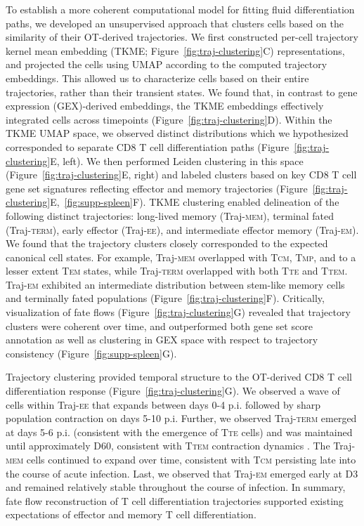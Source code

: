 To establish a more coherent computational model for fitting fluid differentiation paths, we developed an unsupervised approach that clusters cells based on the similarity of their OT-derived trajectories. We first constructed per-cell trajectory kernel mean embedding (TKME; Figure~\ref{fig:traj-clustering}C) representations, and projected the cells using UMAP according to the computed trajectory embeddings. This allowed us to characterize cells based on their entire trajectories, rather than their transient states. We found that, in contrast to gene expression (GEX)-derived embeddings, the TKME embeddings effectively integrated cells across timepoints (Figure~\ref{fig:traj-clustering}D). Within the TKME UMAP space, we observed distinct distributions which we hypothesized corresponded to separate CD8 T cell differentiation paths (Figure~\ref{fig:traj-clustering}E, left). We then performed Leiden clustering in this space (Figure~\ref{fig:traj-clustering}E, right) and labeled clusters based on key CD8 T cell gene set signatures reflecting effector and memory trajectories (Figure~\ref{fig:traj-clustering}E,~\ref{fig:supp-spleen}F). TKME clustering enabled delineation of the following distinct trajectories: long-lived memory (Traj-\textsc{mem}), terminal fated (Traj-\textsc{term}), early effector (Traj-\textsc{ee)}, and intermediate effector memory (Traj-\textsc{em).} We found that the trajectory clusters closely corresponded to the expected canonical cell states. For example, Traj-\textsc{mem} overlapped with T\textsc{cm}, T\textsc{mp}, and to a lesser extent T\textsc{em} states, while Traj-\textsc{term} overlapped with both T\textsc{te} and T\textsc{tem}. Traj-\textsc{em} exhibited an intermediate distribution between stem-like memory cells and terminally fated populations (Figure~\ref{fig:traj-clustering}F). Critically, visualization of fate flows (Figure~\ref{fig:traj-clustering}G) revealed that trajectory clusters were coherent over time, and outperformed both gene set score annotation as well as clustering in GEX space with respect to trajectory consistency (Figure~\ref{fig:supp-spleen}G).

Trajectory clustering provided temporal structure to the OT-derived CD8 T cell differentiation response (Figure~\ref{fig:traj-clustering}G). We observed a wave of cells within Traj-\textsc{ee} that expands between days 0-4 p.i. followed by sharp population contraction on days 5-10 p.i. Further, we observed Traj-\textsc{term} emerged at days 5-6 p.i. (consistent with the emergence of T\textsc{te} cells) and was maintained until approximately D60, consistent with T\textsc{tem} contraction dynamics \citep{milnerDelineationMolecularlyDistinct2020}. The Traj-\textsc{mem} cells continued to expand over time, consistent with T\textsc{cm} persisting late into the course of acute infection. Last, we observed that Traj-\textsc{em} emerged early at D3 and remained relatively stable throughout the course of infection. In summary, fate flow reconstruction of T cell differentiation trajectories supported existing expectations of effector and memory T cell differentiation.

